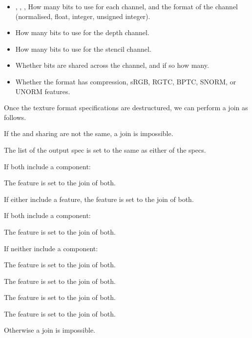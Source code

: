 \documentclass[format=sigconf]{acmart}
\begin{document}
\begin{itemize}
\item {}, , ,  How many bits to use for each channel, and the format of the channel (normalised, float, integer, unsigned integer).
\item {} How many bits to use for the depth channel.
\item {} How many bits to use for the stencil channel.
\item {} Whether bits are shared across the channel, and if so how many.
\item {} Whether the format has compression, sRGB, RGTC, BPTC, SNORM, or UNORM features.
\end{itemize}

Once the texture format specifications are destructured, we can perform a join as follows.

\begin{step}
\item If the  and sharing are not the same, a join is impossible.
\item The  list of the output spec is set to the same as either of the specs.
\item If both include a  component:
  \begin{step}
  \item The  feature is set to the join of both.
  \item If either include a  feature, the  feature is set to the join of both.
  \end{step}
\item If both include a  component:
  \begin{step}
  \item The  feature is set to the join of both.
  \end{step}
\item If neither include a  component:
  \begin{step}
  \item The  feature is set to the join of both.
  \item The  feature is set to the join of both.
  \item The  feature is set to the join of both.
  \item The  feature is set to the join of both.
  \end{step}
\item Otherwise a join is impossible.
\end{step}
\end{document}
